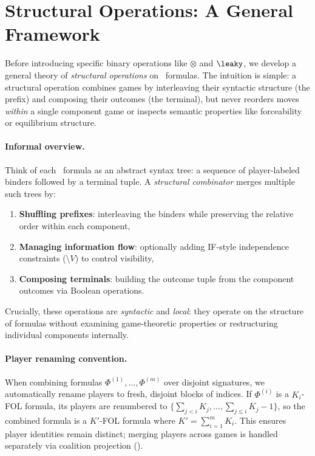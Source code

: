 
\section{Structural Operations: A General Framework}
\label{sec:structural-framework}

Before introducing specific binary operations like $\otimes$ and $\leaky$, 
we develop a general theory of \emph{structural operations} on \KFOL\ formulas.
The intuition is simple: a structural operation combines games by interleaving 
their syntactic structure (the prefix) and composing their outcomes (the terminal), 
but never reorders moves \emph{within} a single component game or inspects 
semantic properties like forceability or equilibrium structure.

\paragraph{Informal overview.}
Think of each \KFOL\ formula as an abstract syntax tree: a sequence of 
player-labeled binders followed by a terminal tuple. A \emph{structural combinator} 
merges multiple such trees by:
\begin{enumerate}[nosep]
  \item \textbf{Shuffling prefixes}: interleaving the binders while preserving 
    the relative order within each component,
  \item \textbf{Managing information flow}: optionally adding IF-style 
    independence constraints ($\setminus V$) to control visibility,
  \item \textbf{Composing terminals}: building the outcome tuple from the 
    component outcomes via Boolean operations.
\end{enumerate}
Crucially, these operations are \emph{syntactic} and \emph{local}: they operate 
on the structure of formulas without examining game-theoretic properties or 
restructuring individual components internally.

\paragraph{Player renaming convention.}
When combining formulas $\Phi^{(1)}, \ldots, \Phi^{(m)}$ over disjoint signatures, 
we automatically rename players to fresh, disjoint blocks of indices. If 
$\Phi^{(i)}$ is a $K_i$-FOL formula, its players are renumbered to 
$\{\sum_{j<i} K_j, \ldots, \sum_{j \leq i} K_j - 1\}$, so the combined formula 
is a $K'$-FOL formula where $K' = \sum_{i=1}^m K_i$. This ensures player 
identities remain distinct; merging players across games is handled separately 
via coalition projection ().

